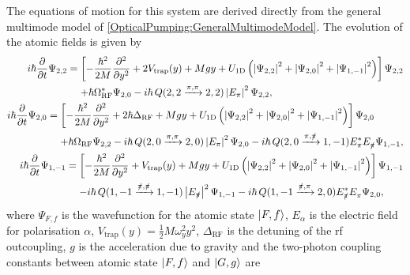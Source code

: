 The equations of motion for this system are derived directly from the general multimode model of \eqref{OpticalPumping:GeneralMultimodeModel}.  The evolution of the atomic fields is given by
\begin{subequations}
    \label{OpticalPumping:3LevelModel:WavefunctionEvolution}
    \begin{align}
        \begin{split}
            i \hbar \frac{\partial}{\partial t} \Psi_{2,2} &= \left[- \frac{\hbar^2}{2 M} \frac{\partial^2}{\partial y^2} + 2 V_\text{trap}(y) + M g y + U_\text{1D}\left(\abs{\Psi_{2, 2}}^2 + \abs{\Psi_{2, 0}}^2 + \abs{\Psi_{1, -1}}^2\right)\right] \Psi_{2, 2} \\
            &\relphantom{=} + \hbar \Omega_\text{RF}^* \Psi_{2, 0} -i \hbar\, Q(2,2 \xrightarrow{\pi,\pi} 2, 2) \abs{E_\pi}^2 \Psi_{2, 2},
        \end{split}\\
        \begin{split}
            i \hbar \frac{\partial}{\partial t} \Psi_{2, 0} &= \left[ - \frac{\hbar^2}{2M} \frac{\partial^2}{\partial y^2} + 2 \hbar \Delta_\text{RF} + M g y + U_\text{1D}\left(\abs{\Psi_{2, 2}}^2 + \abs{\Psi_{2, 0}}^2 + \abs{\Psi_{1, -1}}^2\right)\right] \Psi_{2, 0} \\
            &\relphantom{=} + \hbar \Omega_\text{RF} \Psi_{2, 2}  - i \hbar \,Q({2, 0 \xrightarrow{\pi,\pi} 2, 0}) \abs{E_\pi}^2 \Psi_{2, 0} - i \hbar \,Q(2, 0 \xrightarrow{\pi,\pislash} 1, -1) E_\pi^* E_{\pislash}^{\phantom{*}} \Psi_{1, -1},
        \end{split}\\
        \begin{split}
            i \hbar \frac{\partial}{\partial t} \Psi_{1, -1} &= \left[ - \frac{\hbar^2}{2 M} \frac{\partial^2}{\partial y^2} + V_{\text{trap}}(y) + M g y + U_\text{1D} \left( \abs{\Psi_{2, 2}}^2 + \abs{\Psi_{2, 0}}^2 + \abs{\Psi_{1, -1}}^2\right)  \right] \Psi_{1, -1}\\
            &\relphantom{=} - i \hbar \,Q(1, -1 \xrightarrow{\pislash,\pislash} 1, -1) \abs{E_{\pislash}}^2 \Psi_{1, -1} - i \hbar \,Q(1, -1 \xrightarrow{\pislash,\pi} 2, 0) E_{\pislash}^* E_\pi^{\phantom{*}}\Psi_{2, 0},
        \end{split}
    \end{align}
\end{subequations}
where $\Psi_{F,f}$ is the wavefunction for the atomic state ${\left|F, f\right>}$, $E_\alpha$ is the electric field for polarisation $\alpha$, $V_\text{trap}(y) = \frac{1}{2} M \omega_y^2 y^2$, $\Delta_\text{RF}$ is the detuning of the rf outcoupling, $g$ is the acceleration due to gravity and the two-photon coupling constants between atomic state ${\left|F, f\right>}$ and ${\left|G, g\right>}$ are
